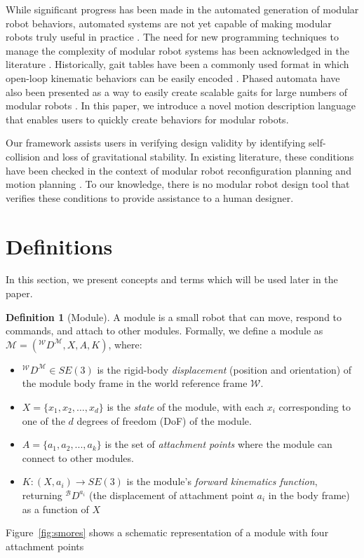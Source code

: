 \documentclass[conference]{IEEEtran}
\theoremstyle{definition}
\newtheorem{definition}{Definition}[section]
\begin{document}
While significant progress has been made in the automated generation of modular robot behaviors,
automated systems are not yet capable of making modular robots truly useful in practice
\cite{yim2007modular}.  The need for new programming techniques to manage the complexity
of modular robot systems has been acknowledged in the literature \cite{yim2000modular}.
Historically, gait tables have been a commonly used format in which open-loop kinematic
behaviors can be easily encoded \cite{yim1994locomotion}. Phased automata have also
been presented as a way to easily create scalable gaits for large numbers of modular
robots \cite{zhang2003phase}. In this paper, we introduce a novel motion description
language that enables users to quickly create behaviors for modular robots.

Our framework assists users in verifying design validity by identifying self-collision
and loss of gravitational stability. In existing literature, these conditions have
been checked in the context of modular robot reconfiguration planning \cite{casal2001reconfiguration} and motion
planning \cite{yoshida2002self}.
To our knowledge, there is no modular robot design tool that verifies
these conditions to provide assistance to a human designer.

\section{Definitions}
\label{sec:preliminaries}
In this section, we present concepts and terms which will be used later in the paper.

\begin{definition}[Module] A module is a small robot that can move, respond to commands,
and attach to other modules.  Formally, we define a  module  as $\mathcal{M}=({^\mathcal{W}}D^{\mathcal{M}}, X, A,
K)$, where:
\begin{itemize}
\item ${^\mathcal{W}}D^{\mathcal{M}}\in SE(3)$ is the rigid-body \textit{displacement} (position and orientation)
of the module body frame in the world reference frame $\mathcal{W}$. 
\item \(X=\lbrace x_1, x_2, \ldots, x_d \rbrace\) is the \textit{state} of the module,
with each \(x_i\) corresponding to one of the \(d\) degrees of freedom (DoF) of the module.
\item $A=\{a_1, a_2, ..., a_k\}$ is the set of \textit{attachment points} where the module can connect to other modules.
\item \(K: (X, a_i) \rightarrow SE(3) \) is the module's \textit{forward kinematics function}, returning \({^\mathcal{B}}D^{a_{i}}\) (the displacement of attachment point \(a_i\)
in the body frame) as a function of \(X\)  \end{itemize}

Figure~\ref{fig:smores} shows a schematic representation of a module with  four attachment points
\end{definition}
\end{document}
